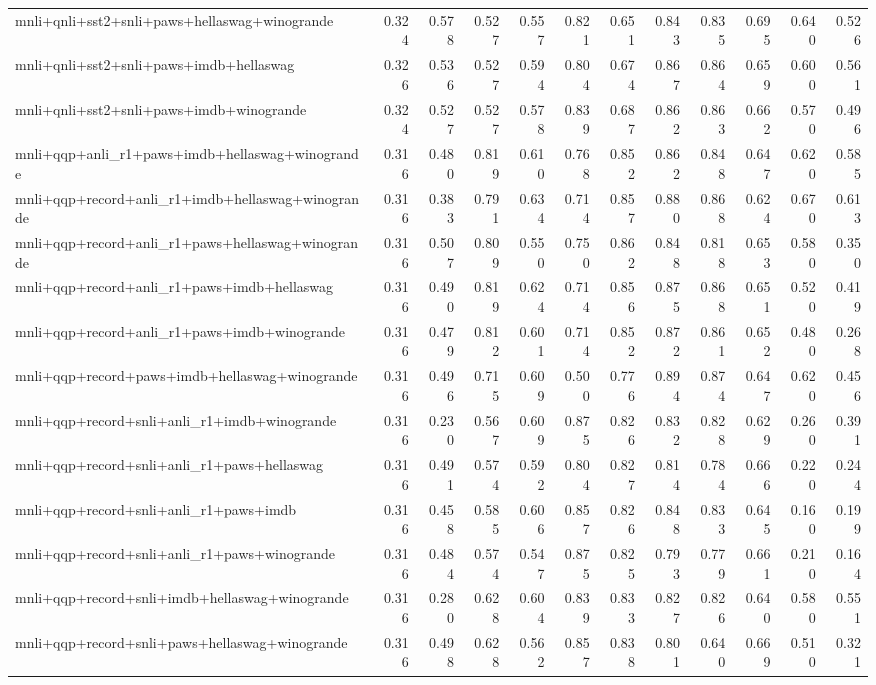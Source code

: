 \begin{table}[t]
\begin{tabular}{lrrrrrrrrrrr}
    mnli+qnli+sst2+snli+paws+hellaswag+winogrande & 0.324 & 0.578 & 0.527 & 0.557 & 0.821 & 0.651 & 0.843 & 0.835 & 0.695 & 0.640 & 0.526 \\
    mnli+qnli+sst2+snli+paws+imdb+hellaswag & 0.326 & 0.536 & 0.527 & 0.594 & 0.804 & 0.674 & 0.867 & 0.864 & 0.659 & 0.600 & 0.561 \\
    mnli+qnli+sst2+snli+paws+imdb+winogrande & 0.324 & 0.527 & 0.527 & 0.578 & 0.839 & 0.687 & 0.862 & 0.863 & 0.662 & 0.570 & 0.496 \\
    mnli+qqp+anli\_r1+paws+imdb+hellaswag+winogrande & 0.316 & 0.480 & 0.819 & 0.610 & 0.768 & 0.852 & 0.862 & 0.848 & 0.647 & 0.620 & 0.585 \\
    mnli+qqp+record+anli\_r1+imdb+hellaswag+winogrande & 0.316 & 0.383 & 0.791 & 0.634 & 0.714 & 0.857 & 0.880 & 0.868 & 0.624 & 0.670 & 0.613 \\
    mnli+qqp+record+anli\_r1+paws+hellaswag+winogrande & 0.316 & 0.507 & 0.809 & 0.550 & 0.750 & 0.862 & 0.848 & 0.818 & 0.653 & 0.580 & 0.350 \\
    mnli+qqp+record+anli\_r1+paws+imdb+hellaswag & 0.316 & 0.490 & 0.819 & 0.624 & 0.714 & 0.856 & 0.875 & 0.868 & 0.651 & 0.520 & 0.419 \\
    mnli+qqp+record+anli\_r1+paws+imdb+winogrande & 0.316 & 0.479 & 0.812 & 0.601 & 0.714 & 0.852 & 0.872 & 0.861 & 0.652 & 0.480 & 0.268 \\
    mnli+qqp+record+paws+imdb+hellaswag+winogrande & 0.316 & 0.496 & 0.715 & 0.609 & 0.500 & 0.776 & 0.894 & 0.874 & 0.647 & 0.620 & 0.456 \\
    mnli+qqp+record+snli+anli\_r1+imdb+winogrande & 0.316 & 0.230 & 0.567 & 0.609 & 0.875 & 0.826 & 0.832 & 0.828 & 0.629 & 0.260 & 0.391 \\
    mnli+qqp+record+snli+anli\_r1+paws+hellaswag & 0.316 & 0.491 & 0.574 & 0.592 & 0.804 & 0.827 & 0.814 & 0.784 & 0.666 & 0.220 & 0.244 \\
    mnli+qqp+record+snli+anli\_r1+paws+imdb & 0.316 & 0.458 & 0.585 & 0.606 & 0.857 & 0.826 & 0.848 & 0.833 & 0.645 & 0.160 & 0.199 \\
    mnli+qqp+record+snli+anli\_r1+paws+winogrande & 0.316 & 0.484 & 0.574 & 0.547 & 0.875 & 0.825 & 0.793 & 0.779 & 0.661 & 0.210 & 0.164 \\
    mnli+qqp+record+snli+imdb+hellaswag+winogrande & 0.316 & 0.280 & 0.628 & 0.604 & 0.839 & 0.833 & 0.827 & 0.826 & 0.640 & 0.580 & 0.551 \\
    mnli+qqp+record+snli+paws+hellaswag+winogrande & 0.316 & 0.498 & 0.628 & 0.562 & 0.857 & 0.838 & 0.801 & 0.640 & 0.669 & 0.510 & 0.321 \\

\end{tabular}
\end{table}
